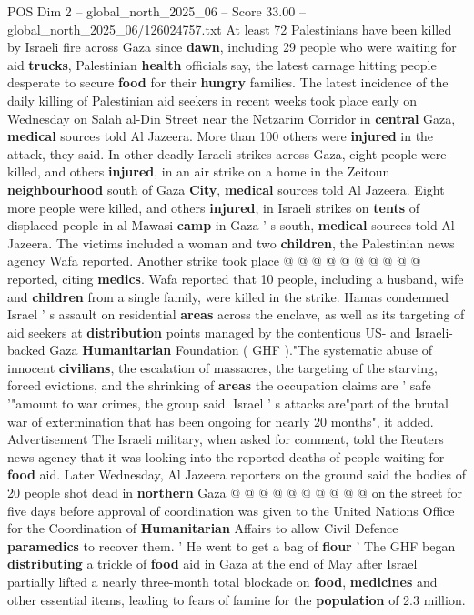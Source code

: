 \begin{textsample}{POS Dim 2 – global\_north\_2025\_06 – Score 33.00 – global\_north\_2025\_06/126024757.txt}  \label{ex:f2_pos_222}
At least 72 Palestinians have been killed by Israeli fire across Gaza since \textbf{dawn}, including 29 people who were waiting for aid \textbf{trucks}, Palestinian \textbf{health} officials say, the latest carnage hitting people desperate to secure \textbf{food} for their \textbf{hungry} families.
The latest incidence of the daily killing of Palestinian aid seekers in recent weeks took place early on Wednesday on Salah al-Din Street near the Netzarim Corridor in \textbf{central} Gaza, \textbf{medical} sources told Al Jazeera.
More than 100 others were \textbf{injured} in the attack, they said.
In other deadly Israeli strikes across Gaza, eight people were killed, and others \textbf{injured}, in an air strike on a home in the Zeitoun \textbf{neighbourhood} south of Gaza \textbf{City}, \textbf{medical} sources told Al Jazeera.
Eight more people were killed, and others \textbf{injured}, in Israeli strikes on \textbf{tents} of displaced people in al-Mawasi \textbf{camp} in Gaza ' s south, \textbf{medical} sources told Al Jazeera.
The victims included a woman and two \textbf{children}, the Palestinian news agency Wafa reported.
Another strike took place @ @ @ @ @ @ @ @ @ @ reported, citing \textbf{medics}.
Wafa reported that 10 people, including a husband, wife and \textbf{children} from a single family, were killed in the strike.
Hamas condemned Israel ' s assault on residential \textbf{areas} across the enclave, as well as its targeting of aid seekers at \textbf{distribution} points managed by the contentious US- and Israeli-backed Gaza \textbf{Humanitarian} Foundation ( GHF )."The systematic abuse of innocent \textbf{civilians}, the escalation of massacres, the targeting of the starving, forced evictions, and the shrinking of \textbf{areas} the occupation claims are ' safe '"amount to war crimes, the group said.
Israel ' s attacks are"part of the brutal war of extermination that has been ongoing for nearly 20 months", it added.
Advertisement The Israeli military, when asked for comment, told the Reuters news agency that it was looking into the reported deaths of people waiting for \textbf{food} aid.
Later Wednesday, Al Jazeera reporters on the ground said the bodies of 20 people shot dead in \textbf{northern} Gaza @ @ @ @ @ @ @ @ @ @ on the street for five days before approval of coordination was given to the United Nations Office for the Coordination of \textbf{Humanitarian} Affairs to allow Civil Defence \textbf{paramedics} to recover them. ' He went to get a bag of \textbf{flour} ' The GHF began \textbf{distributing} a trickle of \textbf{food} aid in Gaza at the end of May after Israel partially lifted a nearly three-month total blockade on \textbf{food}, \textbf{medicines} and other essential items, leading to fears of famine for the \textbf{population} of 2.3 million.

\end{textsample}
